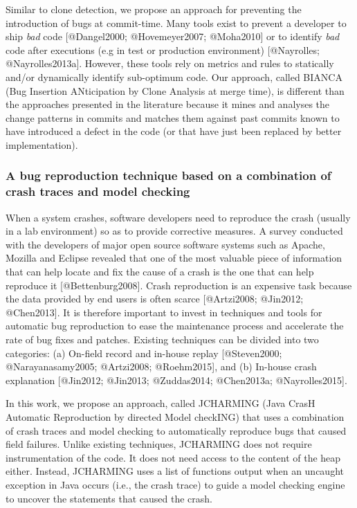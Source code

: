 Similar to clone detection, we propose an approach for preventing the
introduction of bugs at commit-time. Many tools exist to prevent a
developer to ship {\emph{bad}} code {[}@Dangel2000; @Hovemeyer2007;
@Moha2010{]} or to identify {\emph{bad}} code after executions (e.g in
test or production environment) {[}@Nayrolles; @Nayrolles2013a{]}.
However, these tools rely on metrics and rules to statically and/or
dynamically identify sub-optimum code. Our approach, called {BIANCA}
(Bug Insertion ANticipation by Clone Analysis at merge time), is
different than the approaches presented in the literature because it
mines and analyses the change patterns in commits and matches them
against past commits known to have introduced a defect in the code (or
that have just been replaced by better implementation).

\subsubsection{A bug reproduction technique based on a combination of
crash traces and model
checking}\label{a-bug-reproduction-technique-based-on-a-combination-of-crash-traces-and-model-checking}

When a system crashes, software developers need to reproduce the crash
(usually in a lab environment) so as to provide corrective measures. A
survey conducted with the developers of major open source software
systems such as Apache, Mozilla and Eclipse revealed that one of the
most valuable piece of information that can help locate and fix the
cause of a crash is the one that can help reproduce it
{[}@Bettenburg2008{]}. Crash reproduction is an expensive task because
the data provided by end users is often scarce {[}@Artzi2008; @Jin2012;
@Chen2013{]}. It is therefore important to invest in techniques and
tools for automatic bug reproduction to ease the maintenance process and
accelerate the rate of bug fixes and patches. Existing techniques can be
divided into two categories: (a) On-field record and in-house replay
{[}@Steven2000; @Narayanasamy2005; @Artzi2008; @Roehm2015{]}, and (b)
In-house crash explanation {[}@Jin2012; @Jin2013; @Zuddas2014;
@Chen2013a; @Nayrolles2015{]}.

In this work, we propose an approach, called JCHARMING (Java CrasH
Automatic Reproduction by directed Model checkING) that uses a
combination of crash traces and model checking to automatically
reproduce bugs that caused field failures. Unlike existing techniques,
JCHARMING does not require instrumentation of the code. It does not need
access to the content of the heap either. Instead, JCHARMING uses a list
of functions output when an uncaught exception in Java occurs (i.e., the
crash trace) to guide a model checking engine to uncover the statements
that caused the crash.

